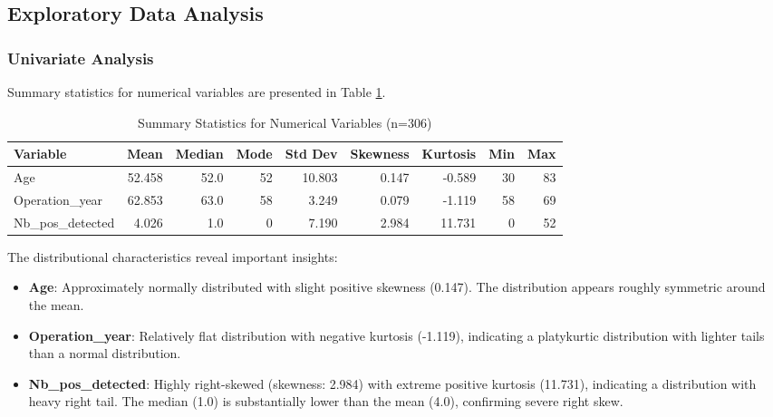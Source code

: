 \documentclass[12pt,a4paper]{article}
\begin{document}
\subsection{Exploratory Data Analysis}

\subsubsection{Univariate Analysis}

Summary statistics for numerical variables are presented in Table \ref{tab:summary_stats}.

\begin{table}[H]
\centering
\caption{Summary Statistics for Numerical Variables (n=306)}
\label{tab:summary_stats}
\begin{tabular}{lrrrrrrrr}
\toprule
\textbf{Variable} & \textbf{Mean} & \textbf{Median} & \textbf{Mode} & \textbf{Std Dev} & \textbf{Skewness} & \textbf{Kurtosis} & \textbf{Min} & \textbf{Max} \\
\midrule
Age & 52.458 & 52.0 & 52 & 10.803 & 0.147 & -0.589 & 30 & 83 \\
Operation\_year & 62.853 & 63.0 & 58 & 3.249 & 0.079 & -1.119 & 58 & 69 \\
Nb\_pos\_detected & 4.026 & 1.0 & 0 & 7.190 & 2.984 & 11.731 & 0 & 52 \\
\bottomrule
\end{tabular}
\end{table}

The distributional characteristics reveal important insights:

\begin{itemize}
    \item \textbf{Age}: Approximately normally distributed with slight positive skewness (0.147). The distribution appears roughly symmetric around the mean.
    
    \item \textbf{Operation\_year}: Relatively flat distribution with negative kurtosis (-1.119), indicating a platykurtic distribution with lighter tails than a normal distribution.
    
    \item \textbf{Nb\_pos\_detected}: Highly right-skewed (skewness: 2.984) with extreme positive kurtosis (11.731), indicating a distribution with heavy right tail. The median (1.0) is substantially lower than the mean (4.0), confirming severe right skew.
\end{itemize}
\end{document}
